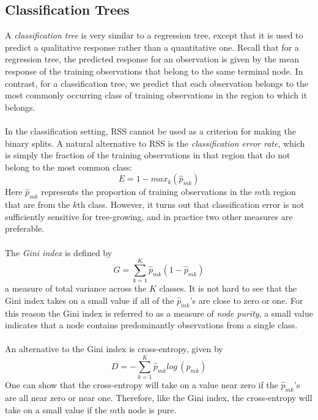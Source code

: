 \subsection{Classification Trees}
A \textit{classification tree} is very similar to a regression tree, except that it is used to predict a qualitative response rather than a quantitative one. Recall that  for a regression tree, the predicted response for an observation is given by the mean response of the training observations that belong to the same terminal node. In contrast, for a classification tree, we predict that each observation belongs to the most commonly occurring class of training observations in the region to which it belongs.\\\\
In the classification setting, RSS cannot be used as a criterion for making the binary splits. A natural alternative to RSS is the \textit{classification error rate}, which is simply the fraction of the training observations in that region that do not belong to the most common class:
\begin{equation}
    E = 1 - max_k(\hat{p}_{mk})
\end{equation}
Here $\hat{p}_{mk}$ represents the proportion of training observations in the $m$th region that are from the $k$th class. However, it turns out that classification error is not sufficiently sensitive for tree-growing, and in practice two other measures are preferable.
\\\\
The \textit{Gini index} is defined by
\begin{equation}
    G = \sum_{k=1}^K \hat{p}_{mk}(1 - \hat{p}_{mk})
\end{equation}
a measure of total variance across the $K$ classes. It is not hard to see
that the Gini index takes on a small value if all of the $\hat{p}_{mk}$’s are close to zero or one. For this reason the Gini index is referred to as a measure of \textit{node purity}, a small value indicates that a node contains predominantly observations from a single class.\\\\
An alternative to the Gini index is cross-entropy, given by
\begin{equation}
    D = -\sum_{k=1}^K \hat{p}_{mk} log\, (\hat{p}_{mk})
\end{equation}
One can show that the cross-entropy will take on a value near zero if the $\hat{p}_{mk}$’s are all near zero or near one. Therefore, like the Gini index, the cross-entropy will take on a small value if the $m$th node is pure.\\\\
